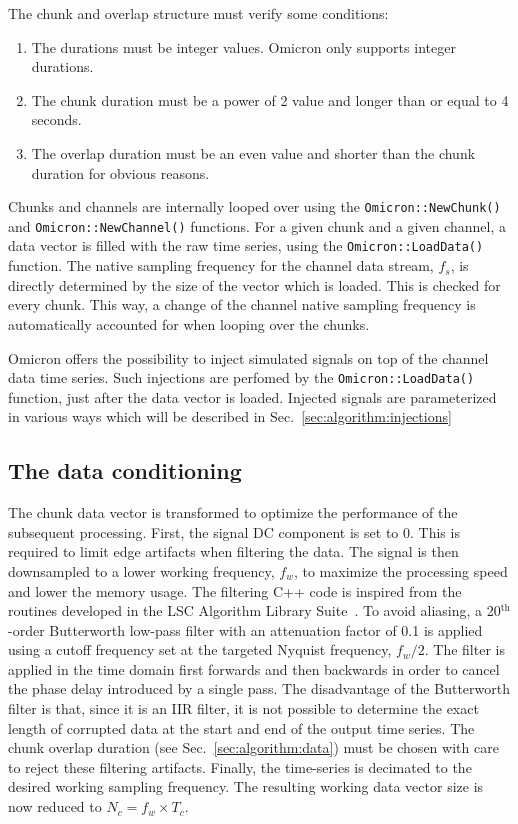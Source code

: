 The chunk and overlap structure must verify some conditions:
\begin{enumerate}
\item The durations must be integer values. Omicron only supports integer durations.
\item The chunk duration must be a power of 2 value and longer than or equal to 4 seconds.
\item The overlap duration must be an even value and shorter than the chunk duration for obvious reasons.
\end{enumerate}

Chunks and channels are internally looped over using the \texttt{Omicron::NewChunk()} and \texttt{Omicron::NewChannel()} functions. For a given chunk and a given channel, a data vector is filled with the raw time series, using the \texttt{Omicron::LoadData()} function. The native sampling frequency for the channel data stream, $f_s$, is directly determined by the size of the vector which is loaded. This is checked for every chunk. This way, a change of the channel native sampling frequency is automatically accounted for when looping over the chunks.

Omicron offers the possibility to inject simulated signals on top of the channel data time series. Such injections are perfomed by the \texttt{Omicron::LoadData()} function, just after the data vector is loaded. Injected signals are parameterized in various ways which will be described in Sec.~\ref{sec:algorithm:injections}


\subsection{The data conditioning} \label{sec:algorithm:conditioning}
The chunk data vector is transformed to optimize the performance of the subsequent processing. First, the signal DC component is set to 0. This is required to limit edge artifacts when filtering the data. The signal is then downsampled to a lower working frequency, $f_w$, to maximize the processing speed and lower the memory usage. The filtering C++ code is inspired from the routines developed in the LSC Algorithm Library Suite~\cite{LALSUITE}. To avoid aliasing, a 20$^{\mathrm{th}}$-order Butterworth low-pass filter with an attenuation factor of 0.1 is applied using a cutoff frequency set at the targeted Nyquist frequency, $f_w/2$. The filter is applied in the time domain first forwards and then backwards in order to cancel the phase delay introduced by a single pass. The disadvantage of the Butterworth filter is that, since it is an IIR filter, it is not possible to determine the exact length of corrupted data at the start and end of the output time series. The chunk overlap duration (see Sec.~\ref{sec:algorithm:data}) must be chosen with care to reject these filtering artifacts. Finally, the time-series is decimated to the desired working sampling frequency. The resulting working data vector size is now reduced to $N_c=f_w \times T_c$.

